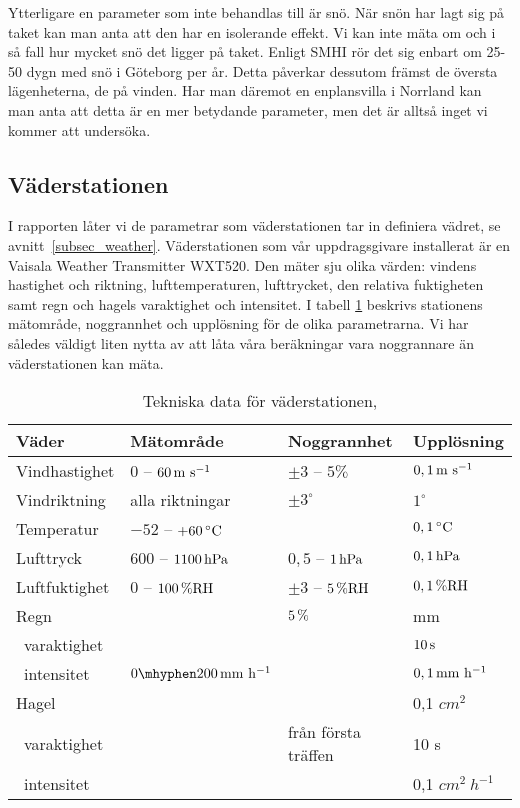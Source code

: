 Ytterligare en parameter som inte behandlas till är snö. När snön har lagt sig på taket kan man anta att den har en isolerande effekt. Vi kan inte mäta om och i så fall hur mycket snö det ligger på taket. Enligt SMHI\cite{SMHIdata}
rör det sig enbart om 25-50 dygn med snö i Göteborg per år. Detta påverkar dessutom främst de översta lägenheterna, de på vinden. Har man däremot en enplansvilla i Norrland kan man anta att detta är en mer betydande parameter, men det är alltså inget vi kommer att undersöka.

\subsection{Väderstationen}
\label{subsec_weathertransmitter}
I rapporten låter vi de parametrar som väderstationen tar in definiera vädret, se avnitt~\ref{subsec_weather}. Väderstationen som vår uppdragsgivare installerat är en Vaisala Weather Transmitter WXT520. Den mäter sju olika värden: vindens hastighet och riktning, lufttemperaturen, lufttrycket, den relativa fuktigheten samt regn och hagels varaktighet och intensitet. I tabell \ref{tbl:weathertransmitter} beskrivs stationens mätområde, noggrannhet och upplösning för de olika parametrarna. Vi har således väldigt liten nytta av att låta våra beräkningar vara noggrannare än väderstationen kan mäta.

\begin{table}[htdp]
\caption{Tekniska data för väderstationen, \cite{datasheet_weathertransmitter}}

\begin{center}
\begin{tabular}{|l | l l l|}
\hline
\textbf{Väder} & \textbf{Mätområde} %
 & \textbf{Noggrannhet} %
 & \textbf{Upplösning} \\ %
\hline
\rule{0pt}{3ex}Vindhastighet & $0$ -- $\unit[60]{m~s^{-1}}$ & $\pm3$ -- $5\%$ & $\unit[0,1]{m~s^{-1}}$ \\ 
\rule{0pt}{3ex}Vindriktning & alla riktningar & $\pm 3^{\circ}$ & $1^{\circ}$ \\
\rule{0pt}{3ex}Temperatur & $-52$ -- $\unit[+60]{^{\circ}C}$ & & $\unit[0,1]{^{\circ}C}$ \\
\rule{0pt}{3ex}Lufttryck & $600$ -- $\unit[1100]{hPa}$ & $0,5$ -- $\unit[1]{hPa}$ & $\unit[0,1]{hPa}$ \\
\rule{0pt}{3ex}Luftfuktighet & $0$ -- $\unit[100]{\%RH}$ & $\pm3$ -- $\unit[ 5]{\%RH}$ & $\unit[0,1]{\%RH}$ \\
\rule{0pt}{3ex}Regn &  & $\unit[5]{\%}$ & \unit[0,01]{mm} \\
~varaktighet & & & $\unit[10]{s}$\\
~intensitet & $\unit[0\mhyphen 200]{mm~h^{-1}}$ & & $\unit[0,1]{mm~h^{-1}}$ \\
\rule{0pt}{3ex}Hagel &  &  & 0,1 $\unit{cm^2}$ \\
~varaktighet & & från första träffen & 10 s\\
~intensitet & & & 0,1 $\unit{cm^2~h^{-1}}$\\
\hline
\end{tabular}
\end{center}
\label{tbl:weathertransmitter}
\end{table}

